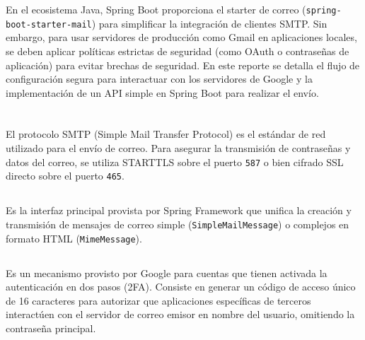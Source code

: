 \documentclass[10pt,a4paper]{article}
\begin{document}
En el ecosistema Java, Spring Boot proporciona el starter de correo (\texttt{spring-boot-starter-mail}) para simplificar la integración de clientes SMTP. Sin embargo, para usar servidores de producción como Gmail en aplicaciones locales, se deben aplicar políticas estrictas de seguridad (como OAuth o contraseñas de aplicación) para evitar brechas de seguridad. En este reporte se detalla el flujo de configuración segura para interactuar con los servidores de Google y la implementación de un API simple en Spring Boot para realizar el envío.

\pagebreak

\section{\color{colorIPN}{Conceptos}}

\subsection{\textit{\color{colorESCOM}{Protocolo SMTP y puertos seguros}}}
El protocolo SMTP (Simple Mail Transfer Protocol) es el estándar de red utilizado para el envío de correo. Para asegurar la transmisión de contraseñas y datos del correo, se utiliza STARTTLS sobre el puerto \texttt{587} o bien cifrado SSL directo sobre el puerto \texttt{465}.

\subsection{\textit{\color{colorESCOM}{JavaMailSender}}}
Es la interfaz principal provista por Spring Framework que unifica la creación y transmisión de mensajes de correo simple (\texttt{SimpleMailMessage}) o complejos en formato HTML (\texttt{MimeMessage}).

\subsection{\textit{\color{colorESCOM}{Google App Passwords (Contraseñas de Aplicación)}}}
Es un mecanismo provisto por Google para cuentas que tienen activada la autenticación en dos pasos (2FA). Consiste en generar un código de acceso único de 16 caracteres para autorizar que aplicaciones específicas de terceros interactúen con el servidor de correo emisor en nombre del usuario, omitiendo la contraseña principal.

\pagebreak
\end{document}
